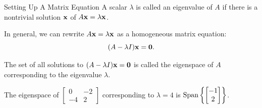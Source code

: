 \documentclass[xcolor=dvipsnames,aspectratio=169,t]{beamer}
\begin{document}
\begin{frame}{Setting Up A Matrix Equation}
  \bbox
  A scalar $\lambda$ is called an \alert{eigenvalue} of $A$ if there is a nontrivial solution $\mathbf{x}$ of $A \mathbf{x} = \lambda \mathbf{x}$.
  \ebox

  In general, we can rewrite $A \mathbf{x} = \lambda \mathbf{x}$ as a homogeneous matrix equation:
  \alert{ \[ (A - \lambda I) \mathbf{x} = \mathbf{0}. \]}

  \bbox
  The set of all solutions to $(A - \lambda I) \mathbf{x} = \mathbf{0}$ is called the \alert{eigenspace} of $A$ corresponding to the eigenvalue $\lambda$.
  \ebox
  \medskip

  The eigenspace of $\begin{bmatrix} 0 & -2 \\ -4 & 2 \end{bmatrix}$ corresponding to $\lambda = 4$ is $\mbox{Span} \left\{ \begin{bmatrix} -1 \\ 2 \end{bmatrix}\right\}$.
\end{frame}
\end{document}
